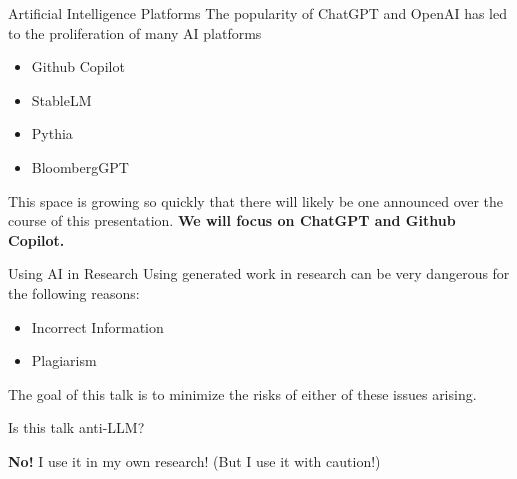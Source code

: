 \documentclass[
	11pt, %
	aspectratio=169, %
]{beamer}
\begin{document}
\begin{frame}{Artificial Intelligence Platforms}
    The popularity of ChatGPT and OpenAI has led to the proliferation of many AI platforms
    \begin{itemize}
        \item Github Copilot
        \item StableLM
        \item Pythia
        \item BloombergGPT
    \end{itemize}
    \vspace{20pt}
    This space is growing so quickly that there will likely be one announced over the course of this presentation. \textbf{
        We will focus on ChatGPT and Github Copilot.}
\end{frame}
\begin{frame}{Using AI in Research}
    Using generated work in research can be very dangerous for the following reasons:
    \vspace{20pt}
    \begin{itemize}
        \item Incorrect Information
        \item Plagiarism
    \end{itemize}
    \vspace{20pt}
    The goal of this talk is to minimize the risks of either of these issues arising. 
\end{frame}
\begin{frame}{Is this talk anti-LLM?}
    \begin{center}
        \textbf{No!} I use it in my own research! (But I use it with caution!)
    \end{center}
\end{frame}
\end{document}
